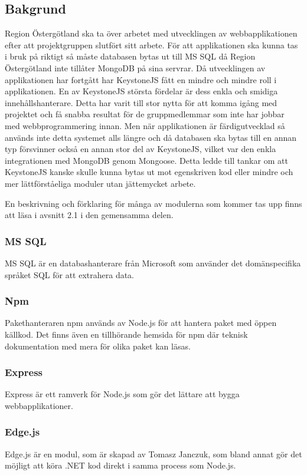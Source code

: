 \subsection{Bakgrund}
Region Östergötland ska ta över arbetet med utvecklingen av webbapplikationen efter att projektgruppen slutfört sitt arbete. För att applikationen ska kunna tas i bruk på riktigt så måste databasen bytas ut till MS SQL då Region Östergötland inte tillåter MongoDB på sina servrar. Då utvecklingen av applikationen har fortgått har KeystoneJS fått en mindre och mindre roll i applikationen. En av KeystoneJS största fördelar är dess enkla och smidiga innehållshanterare. Detta har varit till stor nytta för att komma igång med projektet och få snabba resultat för de gruppmedlemmar som inte har jobbar med webbprogrammering innan. Men när applikationen är färdigutvecklad så används inte detta systemet alls längre och då databasen ska bytas till en annan typ försvinner också en annan stor del av KeystoneJS, vilket var den enkla integrationen med MongoDB genom Mongoose. Detta ledde till tankar om att KeystoneJS kanske skulle kunna bytas ut mot egenskriven kod eller mindre och mer lättförståeliga moduler utan jättemycket arbete.

En beskrivning och förklaring för många av modulerna som kommer tas upp finns att läsa i avsnitt 2.1 i den gemensamma delen.
\subsubsection{MS SQL}
MS SQL är en databashanterare från Microsoft som använder det domänspecifika språket SQL för att extrahera data.

\subsubsection{Npm}
Pakethanteraren npm används av Node.js för att hantera paket med öppen källkod. Det finns även en tillhörande hemsida för npm där teknisk dokumentation med mera för olika paket kan läsas. 

\subsubsection{Express}
Express är ett ramverk för Node.js som gör det lättare att bygga webbapplikationer.

\subsubsection{Edge.js}
Edge.js är en modul, som är skapad av Tomasz Janczuk, som bland annat gör det möjligt att köra .NET kod direkt i samma process som Node.js. 

